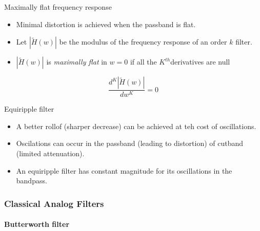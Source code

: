       \begin{block}{Maximally flat frequency response}
        \begin{itemize}
          \item Minimal distortion is achieved when the passband is flat.
        \item Let $|\tilde H(w)|$ be the modulus of the frequency response of an order $k$ filter.
      \item  $|\tilde H(w)|$ is \textit{maximally flat} in 
        $w=0$ if all the $K^{th}$derivatives are null
        \end{itemize}
    $$\frac{d^K|\tilde H(w)|}{dw^K}=0$$
      \end{block}
      \begin{block}{Equiripple filter}
        \begin{itemize}
          \item A better rollof (sharper decrease) can be achieved at teh cost of oscillations.
          \item Oscilations can occur in the passband (leading to distortion) of cutband (limited attenuation).
          \item An equiripple filter has constant magnitude for its oscillations in the bandpass.
        \end{itemize}
      \end{block}

\subsubsection{Classical Analog Filters}

\paragraph{Butterworth filter}

